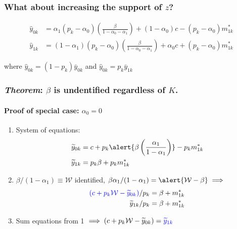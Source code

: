 \documentclass{beamer}
\begin{document}
\begin{frame}
  \frametitle{What about increasing the support of $z$?}
  \alert{}
\begin{align*}
  \hat{y}_{0k} &=\alpha_1(p_k - \alpha_0)\left(\frac{\beta}{1 - \alpha_0 - \alpha_1}\right) + (1-\alpha_0)c - (p _k -  \alpha_0)m_{1k}^* \\[1.5ex]
  \label{eq:MC1IV}
  \hat{y}_{1k} &=(1-\alpha_1)(p_k - \alpha_0)\left(\frac{\beta}{1 - \alpha_0 - \alpha_1}\right) + \alpha_0 c + (p _k -  \alpha_0)m_{1k}^*
\end{align*}

\vspace{0.5em}
where $\hat{y}_{0k}=(1-p_k)\bar{y}_{0k}$ and $\hat{y}_{0k}=p_k\bar{y}_{1k}$


\vspace{2em} 

\hfill \alert{}
\end{frame}
\begin{frame}
  \frametitle{\emph{Theorem}: $\beta$ is undentified regardless of $K$.}
  \framesubtitle{Proof of special case: $\alpha_0 = 0$}
    \begin{enumerate}
      \item System of equations: 
        \vspace{-0.5em}
\begin{align*}
  \widetilde{y}_{0k} &=c + p_k \alert{\beta \left(\frac{\alpha_1}{1 -  \alpha_1}\right)} - p _k m_{1k}^* \\
  \widetilde{y}_{1k} &=p_k \beta + p _k m_{1k}^*
\end{align*}
  \item $\beta/(1-\alpha_1) \equiv \mathcal{W}$ identified,  $\beta\alpha_1/(1-\alpha_1) = \alert{\mathcal{W} - \beta} \implies$ 
        \vspace{-0.5em}
\begin{align*}
\textcolor{blue}{(c + p_k \mathcal{W} - \widetilde{y}_{0k})}/p_k &=\beta + m_{1k}^* \\
  \widetilde{y}_{1k}/p_k &= \beta + m_{1k}^*
\end{align*}
\item Sum equations from 1 $\implies (c + p_k \mathcal{W} - \widetilde{y}_{0k}) = \textcolor{blue}{\widetilde{y}_{1k}}$
    \end{enumerate}
    
\end{frame}
\end{document}
